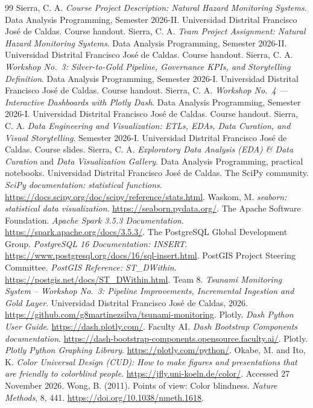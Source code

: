\documentclass[a4paper,11pt,oneside]{book}
\begin{document}
\begin{thebibliography}{99}
 Sierra, C. A. \emph{Course Project Description: Natural Hazard Monitoring Systems}. Data Analysis Programming, Semester 2026-II. Universidad Distrital Francisco Jos\'e de Caldas. Course handout.
 Sierra, C. A. \emph{Team Project Assignment: Natural Hazard Monitoring Systems}. Data Analysis Programming, Semester 2026-II. Universidad Distrital Francisco Jos\'e de Caldas. Course handout.
 Sierra, C. A. \emph{Workshop No.~3: Silver-to-Gold Pipeline, Governance KPIs, and Storytelling Definition}. Data Analysis Programming, Semester 2026-I. Universidad Distrital Francisco Jos\'e de Caldas. Course handout.
 Sierra, C. A. \emph{Workshop No.~4 --- Interactive Dashboards with Plotly Dash}. Data Analysis Programming, Semester 2026-I. Universidad Distrital Francisco Jos\'e de Caldas. Course handout.
 Sierra, C. A. \emph{Data Engineering and Visualization: ETLs, EDAs, Data Curation, and Visual Storytelling}. Semester 2026-I. Universidad Distrital Francisco Jos\'e de Caldas. Course slides.
 Sierra, C. A. \emph{Exploratory Data Analysis (EDA) \& Data Curation} and \emph{Data Visualization Gallery}. Data Analysis Programming, practical notebooks. Universidad Distrital Francisco Jos\'e de Caldas.
 The SciPy community. \emph{SciPy documentation: statistical functions}. \url{https://docs.scipy.org/doc/scipy/reference/stats.html}.
 Waskom, M. \emph{seaborn: statistical data visualization}. \url{https://seaborn.pydata.org/}.
 The Apache Software Foundation. \emph{Apache Spark 3.5.3 Documentation}. \url{https://spark.apache.org/docs/3.5.3/}.
 The PostgreSQL Global Development Group. \emph{PostgreSQL 16 Documentation: INSERT}. \url{https://www.postgresql.org/docs/16/sql-insert.html}.
 PostGIS Project Steering Committee. \emph{PostGIS Reference: ST\_DWithin}. \url{https://postgis.net/docs/ST_DWithin.html}.
 Team 8. \emph{Tsunami Monitoring System -- Workshop No.~3: Pipeline Improvements, Incremental Ingestion and Gold Layer}. Universidad Distrital Francisco Jos\'e de Caldas, 2026. \url{https://github.com/g8martinezsilva/tsunami-monitoring}.
 Plotly. \emph{Dash Python User Guide}. \url{https://dash.plotly.com/}.
 Faculty AI. \emph{Dash Bootstrap Components documentation}. \url{https://dash-bootstrap-components.opensource.faculty.ai/}.
 Plotly. \emph{Plotly Python Graphing Library}. \url{https://plotly.com/python/}.
 Okabe, M. and Ito, K. \emph{Color Universal Design (CUD): How to make figures and presentations that are friendly to colorblind people}. \url{https://jfly.uni-koeln.de/color/}. Accessed 27 November 2026.
 Wong, B. (2011). Points of view: Color blindness. \emph{Nature Methods}, 8, 441. \url{https://doi.org/10.1038/nmeth.1618}.
\end{thebibliography}
\end{document}

